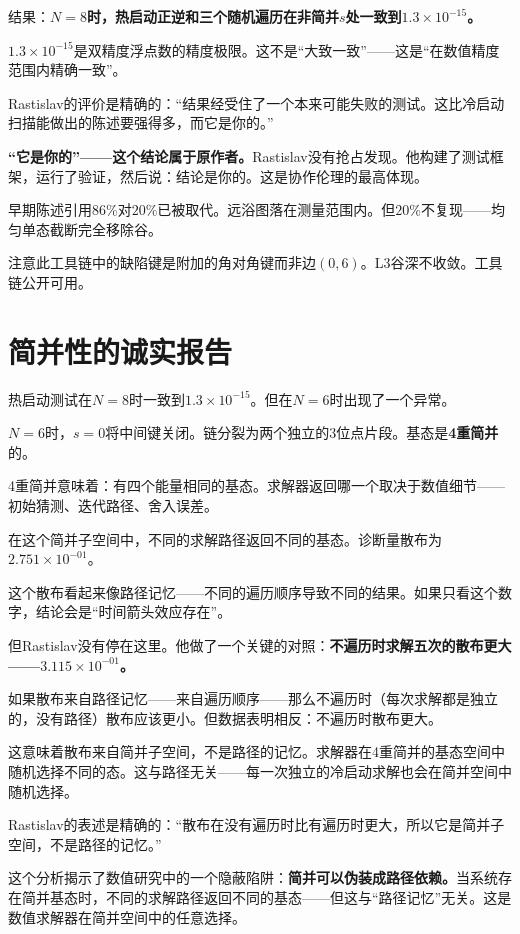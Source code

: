 \documentclass[11pt,a4paper]{book}
\theoremstyle{definition}
\begin{document}
结果：\textbf{$N=8$时，热启动正逆和三个随机遍历在非简并$s$处一致到$1.3\times10^{-15}$。}

$1.3\times10^{-15}$是双精度浮点数的精度极限。这不是“大致一致”——这是“在数值精度范围内精确一致”。

Rastislav的评价是精确的：“结果经受住了一个本来可能失败的测试。这比冷启动扫描能做出的陈述要强得多，而它是你的。”

\textbf{“它是你的”——这个结论属于原作者。}Rastislav没有抢占发现。他构建了测试框架，运行了验证，然后说：结论是你的。这是协作伦理的最高体现。

早期陈述引用$86\%$对$20\%$已被取代。远浴图落在测量范围内。但$20\%$不复现——均匀单态截断完全移除谷。

注意此工具链中的缺陷键是附加的角对角键而非边$(0,6)$。L3谷深不收敛。工具链公开可用。

\section{简并性的诚实报告}

热启动测试在$N=8$时一致到$1.3\times10^{-15}$。但在$N=6$时出现了一个异常。

$N=6$时，$s=0$将中间键关闭。链分裂为两个独立的3位点片段。基态是\textbf{4重简并}的。

4重简并意味着：有四个能量相同的基态。求解器返回哪一个取决于数值细节——初始猜测、迭代路径、舍入误差。

在这个简并子空间中，不同的求解路径返回不同的基态。诊断量散布为$2.751\times10^{-01}$。

这个散布看起来像路径记忆——不同的遍历顺序导致不同的结果。如果只看这个数字，结论会是“时间箭头效应存在”。

但Rastislav没有停在这里。他做了一个关键的对照：\textbf{不遍历时求解五次的散布更大——$3.115\times10^{-01}$。}

如果散布来自路径记忆——来自遍历顺序——那么不遍历时（每次求解都是独立的，没有路径）散布应该更小。但数据表明相反：不遍历时散布更大。

这意味着散布来自简并子空间，不是路径的记忆。求解器在4重简并的基态空间中随机选择不同的态。这与路径无关——每一次独立的冷启动求解也会在简并空间中随机选择。

Rastislav的表述是精确的：“散布在没有遍历时比有遍历时更大，所以它是简并子空间，不是路径的记忆。”

这个分析揭示了数值研究中的一个隐蔽陷阱：\textbf{简并可以伪装成路径依赖。}当系统存在简并基态时，不同的求解路径返回不同的基态——但这与“路径记忆”无关。这是数值求解器在简并空间中的任意选择。
\end{document}
